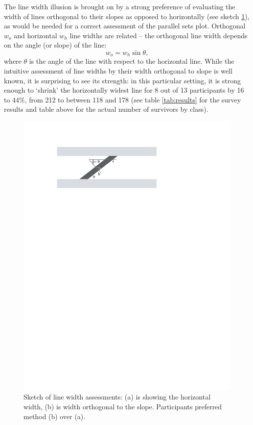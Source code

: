 The line width illusion is brought on by a strong preference of evaluating the width of lines orthogonal to their slopes as opposed to horizontally (see sketch \ref{fig:linewidth}), as would be needed for a correct assessment of the parallel sets plot.
Orthogonal $w_o$ and horizontal $w_h$ line widths are related -- the orthogonal line width depends on the angle (or slope) of the line:
\[
w_o = w_h \sin \theta,
\]
where $\theta$ is the angle of the line with respect to the horizontal line.
While the intuitive assessment of line widths by their width orthogonal to slope is well known, it is surprising to see its strength: in this particular setting, it is strong enough to `shrink' the horizontally widest line for 8 out of 13 participants by  16 to 44\%, from 212 to between 118 and 178 (see table \ref{tab:results} for the survey results and table above for the actual number of survivors by class). 

\begin{figure}[htbp]
\begin{center}
\includegraphics[width=0.6\linewidth]{images/linewidth}
\end{center}
\caption{\label{fig:linewidth}Sketch of line width assessments: (a) is showing the horizontal width, (b) is  width orthogonal to the slope. Participants preferred method (b) over (a).}
\end{figure}

